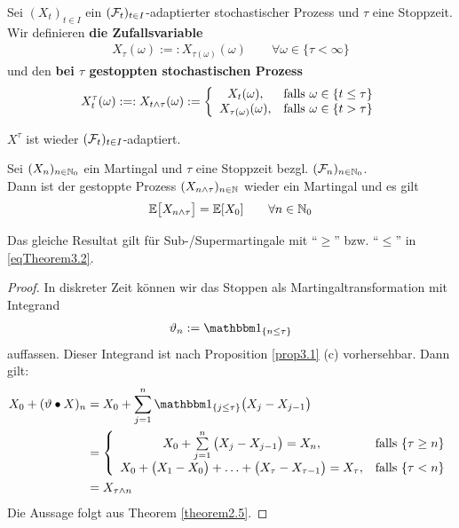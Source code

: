 \begin{defi}
	Sei $(X_t)_{t\in I}$ ein $(\mathcal{F}_t)_{t\in I}$-adaptierter stochastischer Prozess und $\tau$ eine Stoppzeit. Wir definieren \textbf{die Zufallsvariable}
\begin{align*}
X_\tau(\omega):=:X_{\tau(\omega)}(\omega)\qquad\forall \omega\in\lbrace\tau<\infty\rbrace
\end{align*} 
und den \textbf{bei $\tau$ gestoppten stochastischen Prozess}
\begin{align*}
X_t^\tau(\omega):=:X_{t\wedge\tau}(\omega):=\left\lbrace\begin{array}{cl}
X_t(\omega), & \text{falls } \omega\in\lbrace t\leq\tau\rbrace\\
X_{\tau(\omega)}(\omega), &\text{falls }\omega\in\lbrace t>\tau\rbrace
\end{array}\right.
\end{align*}
\end{defi}

\begin{bemerkung}
$X^\tau$ ist wieder $(\mathcal{F}_t)_{t\in I}$-adaptiert.
\end{bemerkung}

\begin{theorem}\label{theorem3.2}
Sei $(X_n)_{n\in\mathbb{N}_0}$ ein Martingal und $\tau$ eine Stoppzeit bezgl. $(\mathcal{F}_n)_{n\in\mathbb{N}_0}$.\\
Dann ist der gestoppte Prozess $(X_{n\wedge\tau})_{n\in\mathbb{N}}$ wieder ein Martingal und es gilt
\begin{align}\label{eqTheorem3.2}
\mathbb{E}\big[X_{n\wedge\tau}\big]=\mathbb{E}[X_0]\qquad\forall n\in\mathbb{N}_0
\end{align}
\end{theorem}

\begin{bemerkung}
Das gleiche Resultat gilt für Sub-/Supermartingale mit ``$\geq$'' bzw. ``$\leq$'' in \eqref{eqTheorem3.2}.
\end{bemerkung}

\begin{proof}
In diskreter Zeit können wir das Stoppen als Martingaltransformation mit Integrand
\begin{align*}
\vartheta_n:=\indi_{\lbrace n\leq\tau\rbrace}
\end{align*}
auffassen. Dieser Integrand ist nach Proposition \ref{prop3.1} (c) vorhersehbar. Dann gilt:
\begin{align*}
X_0+(\vartheta\bullet X)_n&=
X_0+\sum\limits_{j=1}^n\indi_{\lbrace j\leq\tau\rbrace}\big(X_j-X_{j-1}\big)\\
&=\left\lbrace\begin{array}{cl}
X_0+\sum\limits_{j=1}^n\big(X_j-X_{j-1}\big)=X_n,&\falls\lbrace\tau\geq n\rbrace\\
X_0+\big(X_1-X_0\big)+\ldots+\big(X_\tau-X_{\tau-1}\big)=X_\tau, &\falls \lbrace\tau<n\rbrace
\end{array}\right.\\
&=X_{\tau\wedge n}
\end{align*}
Die Aussage folgt aus Theorem \ref{theorem2.5}.
\end{proof}

